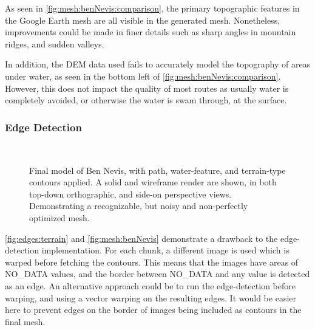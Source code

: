 \documentclass[12pt]{article}
\begin{document}
As seen in \autoref{fig:mesh:benNevis:comparison}, the primary topographic features in the Google Earth mesh are all visible in the generated mesh. Nonetheless, improvements could be made in finer details such as sharp angles in mountain ridges, and sudden valleys.

In addition, the DEM data used fails to accurately model the topography of areas under water, as seen in the bottom left of \autoref{fig:mesh:benNevis:comparison}. However, this does not impact the quality of most routes as usually water is completely avoided, or otherwise the water is swam through, at the surface.

\subsubsection{Edge Detection}

\begin{figure}[!htbp]
  \centering
  \\
  \caption{Final model of Ben Nevis, with path, water-feature, and terrain-type contours applied. A solid and wireframe render are shown, in both top-down orthographic, and side-on perspective views. Demonstrating a recognizable, but noisy and non-perfectly optimized mesh.}\label{fig:mesh:benNevis}
\end{figure}

\autoref{fig:edges:terrain} and \autoref{fig:mesh:benNevis} demonstrate a drawback to the edge-detection implementation. For each chunk, a different image is used which is warped before fetching the contours. This means that the images have areas of NO\_DATA values, and the border between NO\_DATA and any value is detected as an edge. An alternative approach could be to run the edge-detection before warping, and using a vector warping on the resulting edges. It would be easier here to prevent edges on the border of images being included as contours in the final mesh.
\end{document}
